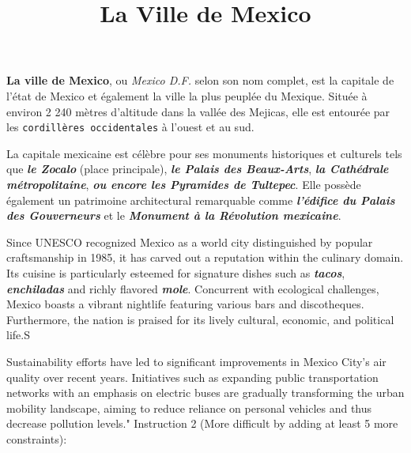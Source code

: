 \documentclass[12pt, a4paper]{article}
\title{La Ville de Mexico}
\author{}
\date{}
\begin{document}
   \maketitle

\textbf{La ville de Mexico}, ou \textit{Mexico D.F.} selon son nom complet, est la capitale de l'état de Mexico et également la ville la plus peuplée du Mexique. Située à environ 2 240 mètres d'altitude dans la vallée des Mejicas, elle est entourée par les \texttt{cordillères occidentales} à l'ouest et au sud.

La capitale mexicaine est célèbre pour ses monuments historiques et culturels tels que \textbf{\textit{le Zocalo}} (place principale), \textbf{\textit{le Palais des Beaux-Arts}}, \textbf{\textit{la Cathédrale métropolitaine}}, \textbf{\textit{ou encore les Pyramides de Tultepec}}. Elle possède également un patrimoine architectural remarquable comme \textbf{\textit{l'édifice du Palais des Gouverneurs}} et le \textbf{\textit{Monument à la Révolution mexicaine}}.

Since UNESCO recognized Mexico as a world city distinguished by popular craftsmanship in 1985, it has carved out a reputation within the culinary domain. Its cuisine is particularly esteemed for signature dishes such as \textbf{\textit{tacos}}, \textbf{\textit{enchiladas}} and richly flavored \textbf{\textit{mole}}.
Concurrent with ecological challenges, Mexico boasts a vibrant nightlife featuring various bars and discotheques. Furthermore, the nation is praised for its lively cultural, economic, and political life.S

Sustainability efforts have led to significant improvements in Mexico City's air quality over recent years. Initiatives such as expanding public transportation networks with an emphasis on electric buses are gradually transforming the urban mobility landscape, aiming to reduce reliance on personal vehicles and thus decrease pollution levels." Instruction 2 (More difficult by adding at least {5} more constraints):

	
  
\end{document}
